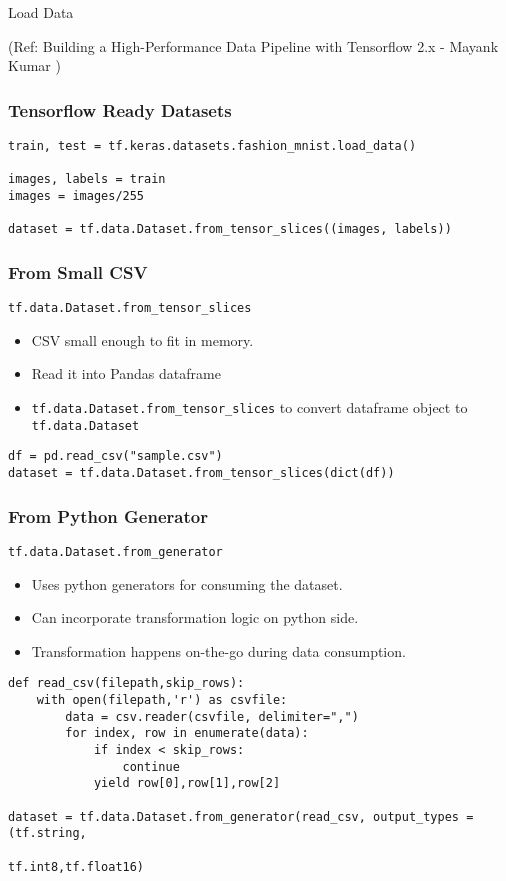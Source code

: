 \begin{frame}
  \begin{center}
    {\Large Load Data}
	
	{\tiny (Ref: Building a High-Performance Data Pipeline with Tensorflow 2.x - Mayank Kumar )}
  \end{center}
\end{frame}

\begin{frame}[fragile]\frametitle{Tensorflow Ready Datasets}
\begin{lstlisting}
train, test = tf.keras.datasets.fashion_mnist.load_data()

images, labels = train
images = images/255

dataset = tf.data.Dataset.from_tensor_slices((images, labels))
\end{lstlisting}
\end{frame}

\begin{frame}[fragile]\frametitle{From Small CSV}
\lstinline|tf.data.Dataset.from_tensor_slices|

\begin{itemize}
\item CSV small enough to fit in memory.
\item Read it into Pandas dataframe
\item \lstinline|tf.data.Dataset.from_tensor_slices| to convert dataframe object to \lstinline|tf.data.Dataset|
\end{itemize}

\begin{lstlisting}
df = pd.read_csv("sample.csv")
dataset = tf.data.Dataset.from_tensor_slices(dict(df))
\end{lstlisting}
\end{frame}

\begin{frame}[fragile]\frametitle{From Python Generator}
\lstinline|tf.data.Dataset.from_generator|

\begin{itemize}
\item Uses python generators for consuming the dataset.
\item Can incorporate transformation logic on python side.
\item Transformation happens on-the-go during data consumption.
\end{itemize}

\begin{lstlisting}
def read_csv(filepath,skip_rows):
	with open(filepath,'r') as csvfile:
		data = csv.reader(csvfile, delimiter=",")
		for index, row in enumerate(data):
			if index < skip_rows:
				continue
			yield row[0],row[1],row[2]
			
dataset = tf.data.Dataset.from_generator(read_csv, output_types =(tf.string,
																					tf.int8,tf.float16)
\end{lstlisting}
\end{frame}

